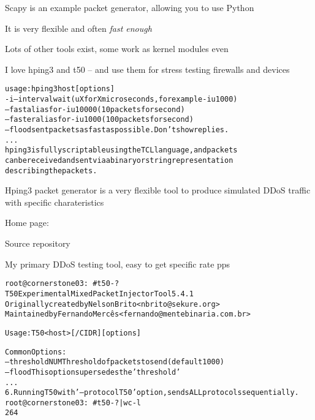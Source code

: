 \documentclass[Screen16to9,17pt]{foils}
\begin{document}
\begin{list2}
\item Scapy is an example packet generator, allowing you to use Python
\item It is very flexible and often \emph{fast enough}
\item Lots of other tools exist, some work as kernel modules even
\item I love hping3 and t50 -- and use them for stress testing firewalls and devices
\end{list2}



\begin{alltt}\footnotesize
usage: hping3 host [options]
  -i  --interval  wait (uX for X microseconds, for example -i u1000)
      --fast      alias for -i u10000 (10 packets for second)
      --faster    alias for -i u1000 (100 packets for second)
      --flood	   sent packets as fast as possible. Don't show replies.
...
hping3 is fully scriptable using the TCL language, and packets
can be received and sent via a binary or string representation
describing the packets.
\end{alltt}

\begin{list2}
\item Hping3 packet generator is a very flexible tool to produce simulated DDoS traffic with specific charateristics
\item Home page: 
\item Source repository 
\end{list2}

\centerline{My primary DDoS testing tool, easy to get specific rate pps}




\begin{alltt}\footnotesize
root@cornerstone03:~# t50 -?
T50 Experimental Mixed Packet Injector Tool 5.4.1
Originally created by Nelson Brito <nbrito@sekure.org>
Maintained by Fernando Mercês <fernando@mentebinaria.com.br>

Usage: T50 <host> [/CIDR] [options]

Common Options:
    --threshold NUM        Threshold of packets to send     (default 1000)
    --flood                This option supersedes the 'threshold'
...
6. Running T50 with '--protocol T50' option, sends ALL protocols sequentially.
root@cornerstone03:~# t50 -? | wc -l
264
\end{alltt}
\end{document}
